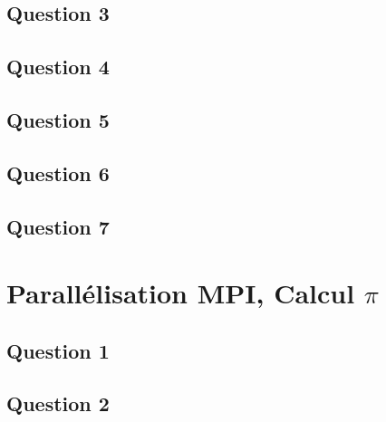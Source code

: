 \documentclass{article}
\begin{document}
\newpage\subsection*{Question 3}
\begin{resolution}
    
\end{resolution}

\newpage\subsection*{Question 4}
\begin{resolution}
    
\end{resolution}

\newpage\subsection*{Question 5}
\begin{resolution}
    
\end{resolution}

\newpage\subsection*{Question 6}
\begin{resolution}
    
\end{resolution}

\newpage\subsection*{Question 7}
\begin{resolution}
    
\end{resolution}


\section{Parallélisation MPI, Calcul $\pi$}
\newpage\subsection*{Question 1}

\newpage\subsection*{Question 2}
\end{document}
